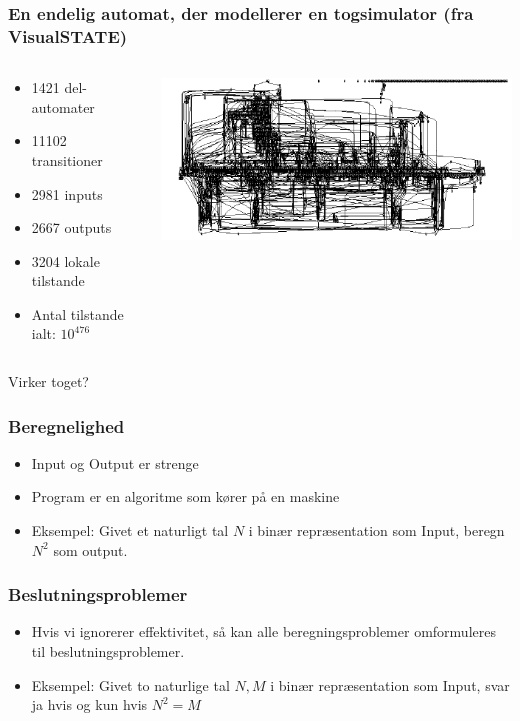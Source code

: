 \documentclass[]{beamer}
\begin{document}
\begin{frame}
  \frametitle{En endelig automat, der modellerer en togsimulator (fra VisualSTATE)}
\begin{columns}
    \begin{column}{0.4\textwidth}
\begin{itemize}
\item 1421 del-automater
\item 11102 transitioner
\item 2981 inputs
\item 2667 outputs
\item 3204 lokale tilstande
\item Antal tilstande ialt: $10^{476}$
\end{itemize}        
    \end{column}
    \begin{column}{0.5\textwidth}
        \includegraphics[width=1\textwidth]{images/1_seminar_futtog}
    \end{column}
\end{columns}
\begin{center}
Virker toget?
\end{center}
\end{frame}

\begin{frame}
\frametitle{Beregnelighed}
\begin{itemize}
\item Input og Output er strenge
\item Program er en algoritme som kører på en maskine
\item Eksempel: Givet et naturligt tal $N$ i binær repræsentation som Input,
beregn $N^2$ som output.
\end{itemize}
\end{frame}

\begin{frame}
\frametitle{Beslutningsproblemer}
\begin{itemize}
\item Hvis vi ignorerer effektivitet, så kan alle beregningsproblemer omformuleres til beslutningsproblemer.
\item Eksempel: Givet to naturlige tal $N,M$ i binær repræsentation som Input,
svar ja hvis og kun hvis $N^2 = M$
\end{itemize}
\end{frame}
\end{document}
